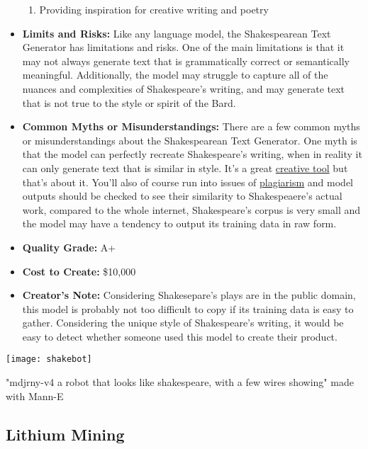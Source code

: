 \begin{itemize}
\begin{enumerate}
        \item Providing inspiration for creative writing and poetry
        \end{enumerate}
\item \textbf{Limits and Risks:} Like any language model, the Shakespearean Text Generator has limitations and risks. One of the main limitations is that it may not always generate text that is grammatically correct or semantically meaningful. Additionally, the model may struggle to capture all of the nuances and complexities of Shakespeare's writing, and may generate text that is not true to the style or spirit of the Bard.
\item \textbf{Common Myths or Misunderstandings:}
There are a few common myths or misunderstandings about the Shakespearean Text Generator. One myth is that the model can perfectly recreate Shakespeare's writing, when in reality it can only generate text that is similar in style. It's a great \hyperref[sec:creative]{creative tool} but that's about it. You'll also of course run into issues of \hyperref[sec:plag]{plagiarism} and model outputs should be checked to see their similarity to Shakespeaere's actual work, compared to the whole internet, Shakespeare's corpus is very small and the model may have a tendency to output its training data in raw form.
    \item \textbf{Quality Grade:} A+
    \item \textbf{Cost to Create:} \$10,000
    \item \textbf{Creator's Note:} Considering Shakesepare's plays are in the public domain, this model is probably not too difficult to copy if its training data is easy to gather. Considering the unique style of Shakespeare's writing, it would be easy to detect whether someone used this model to create their product.
\end{itemize}

\begin{pdf}
\begin{marginfigure}[-5.5cm]
        \texttt{[image: shakebot]}
        \caption{"mdjrny-v4 a robot that looks like shakespeare, with a few wires showing" made with Mann-E}
\end{marginfigure}
\end{pdf}

\subsection{Lithium Mining}


